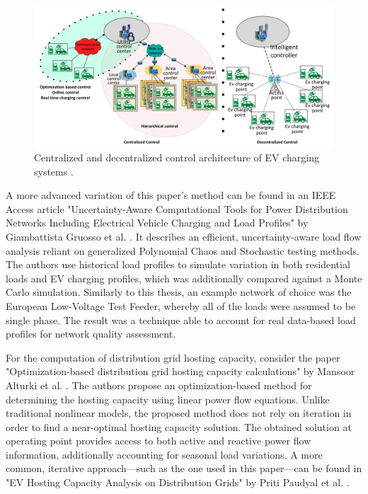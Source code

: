 \documentclass[a4paper,10pt]{report}
\begin{document}
\begin{figure}[htpb]
	\centering
	\includegraphics[width=\linewidth]{centralized_vs_decentr_ctrl}
	\caption[Centralized and decentralized control architecture]{Centralized and decentralized control architecture of EV charging systems \cite{Das2020}.}
	\label{centralized_vs_decentr_ctrl}
\end{figure}

A more advanced variation of this paper's method can be found in an IEEE Access article "Uncertainty-Aware Computational Tools for Power Distribution Networks Including Electrical Vehicle Charging and Load Profiles" by Giambattista Gruosso et al. \cite{Gruosso2019}. It describes an efficient, uncertainty-aware load flow analysis reliant on generalized Polynomial Chaos and Stochastic testing methods. The authors use historical load profiles to simulate variation in both residential loads and EV charging profiles, which was additionally compared against a Monte Carlo simulation. Similarly to this thesis, an example network of choice was the European Low-Voltage Test Feeder, whereby all of the loads were assumed to be single phase. The result was a technique able to account for real data-based load profiles for network quality assessment.

For the computation of distribution grid hosting capacity, consider the paper "Optimization-based distribution grid hosting capacity calculations" by Mansoor Alturki et al. \cite{Alturki2018}. The authors propose an optimization-based method for determining the hosting capacity using linear power flow equations. Unlike traditional nonlinear models, the proposed method does not rely on iteration in order to find a near-optimal hosting capacity solution. The obtained solution at operating point provides access to both active and reactive power flow information, additionally accounting for seasonal load variations. A more common, iterative approach---such as the one used in this paper---can be found in "EV Hosting Capacity Analysis on Distribution Grids" by Priti Paudyal et al. \cite{PritiPaudyal2021}.
\end{document}
